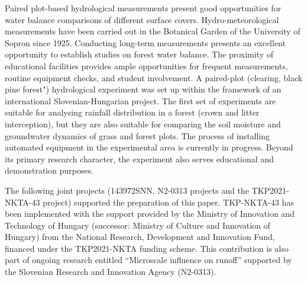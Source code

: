 Paired plot-based hydrological measurements present good opportunities for water balance comparisons of different surface covers. Hydro-meteorological measurements have been carried out in the Botanical Garden of the University of Sopron since 1925. Conducting long-term measurements presents an excellent opportunity to establish studies on forest water balance. The proximity of educational facilities provides ample opportunities for frequent measurements, routine equipment checks, and student involvement. A paired-plot (clearing, black pine forest") hydrological experiment was set up within the framework of an international Slovenian-Hungarian project. The first set of experiments are suitable for analysing rainfall distribution in a forest (crown and litter interception), but they are also suitable for comparing the soil moisture and groundwater dynamics of grass and forest plots. The process of installing automated equipment in the experimental area is currently in progress. Beyond its primary research character, the experiment also serves educational and demonstration purposes.

The following joint projects (143972SNN, N2-0313 projects and the TKP2021-NKTA-43 project) supported the preparation of this paper. TKP-NKTA-43 has been implemented with the support provided by the Ministry of Innovation and Technology of Hungary (successor: Ministry of Culture and Innovation of Hungary) from the National Research, Development and Innovation Fund, financed under the TKP2021-NKTA funding scheme. This contribution is also part of ongoing research entitled “Microscale influence on runoff” supported by the Slovenian Research and Innovation Agency (N2-0313).





\newpage{}
{}
\begin{flushleft}






\end{flushleft}

